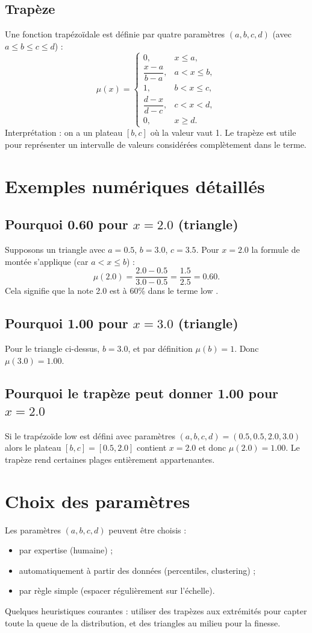 \documentclass[a4paper,11pt]{article}
\begin{document}
\subsection{Trapèze}
Une fonction trapézoïdale est définie par quatre paramètres $(a,b,c,d)$ (avec $a\le b \le c \le d$) :
\[
\mu(x)=\begin{cases}
0, & x\le a,\\
\dfrac{x-a}{b-a}, & a < x \le b,\\
1, & b < x \le c,\\
\dfrac{d-x}{d-c}, & c < x < d,\\
0, & x\ge d.
\end{cases}
\]
Interprétation : on a un plateau $[b,c]$ où la valeur vaut 1. Le trapèze est utile pour représenter un intervalle de valeurs considérées \og complètement \fg{} dans le terme.

\section{Exemples numériques détaillés}
\subsection{Pourquoi 0.60 pour $x=2.0$ (triangle)}
Supposons un triangle avec $a=0.5$, $b=3.0$, $c=3.5$. Pour $x=2.0$ la formule de montée s'applique (car $a < x \le b$) :
\[
\mu(2.0)=\frac{2.0-0.5}{3.0-0.5}=\frac{1.5}{2.5}=0.60.
\]
Cela signifie que la note 2.0 est à 60\% dans le terme \og low \fg{}.

\subsection{Pourquoi 1.00 pour $x=3.0$ (triangle)}
Pour le triangle ci-dessus, $b=3.0$, et par définition $\mu(b)=1$. Donc $\mu(3.0)=1.00$.

\subsection{Pourquoi le trapèze peut donner 1.00 pour $x=2.0$}
Si le trapézoïde low est défini avec paramètres $(a,b,c,d)=(0.5,0.5,2.0,3.0)$ alors le plateau $[b,c]=[0.5,2.0]$ contient $x=2.0$ et donc $\mu(2.0)=1.00$. Le trapèze rend certaines plages \og entièrement \fg{} appartenantes.

\section{Choix des paramètres}
Les paramètres $(a,b,c,d)$ peuvent être choisis :
\begin{itemize}
  \item par expertise (humaine) ;
  \item automatiquement à partir des données (percentiles, clustering) ;
  \item par règle simple (espacer régulièrement sur l'échelle).
\end{itemize}
Quelques heuristiques courantes : utiliser des trapèzes aux extrémités pour capter toute la queue de la distribution, et des triangles au milieu pour la finesse.
\end{document}
